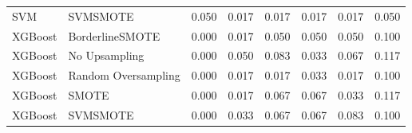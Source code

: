 \begin{tabular}{llllllll}
                            SVM &                      SVMSMOTE & 0.050 &                     0.017 &                 0.017 &                  0.017 &                                   0.017 &    0.050 \\
                        XGBoost &               BorderlineSMOTE & 0.000 &                     0.017 &                 0.050 &                  0.050 &                                   0.050 &    0.100 \\
                        XGBoost &                 No Upsampling & 0.000 &                     0.050 &                 0.083 &                  0.033 &                                   0.067 &    0.117 \\
                        XGBoost &           Random Oversampling & 0.000 &                     0.017 &                 0.017 &                  0.033 &                                   0.017 &    0.100 \\
                        XGBoost &                         SMOTE & 0.000 &                     0.017 &                 0.067 &                  0.067 &                                   0.033 &    0.117 \\
                        XGBoost &                      SVMSMOTE & 0.000 &                     0.033 &                 0.067 &                  0.067 &                                   0.083 &    0.100 \\
\bottomrule
\end{tabular}
